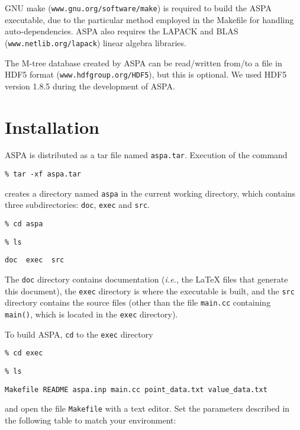 \documentclass[12pt]{article}
\begin{document}
GNU make ({\tt www.gnu.org/software/make}) is required to build the
ASPA executable, due to the particular method employed in the Makefile
for handling auto-dependencies.  ASPA also requires the LAPACK and BLAS
({\tt www.netlib.org/lapack}) linear algebra libraries.

The M-tree database created by ASPA can be read/written from/to a file
in HDF5 format ({\tt www.hdfgroup.org/HDF5}), but this is optional.  We used
HDF5 version 1.8.5 during the development of ASPA.

\section{Installation}

ASPA is distributed as a tar file named {\tt aspa.tar}.  Execution of the command

\vspace{1em}
{\tt \% tar -xf aspa.tar}

\vspace{1em}
\noindent creates a directory named {\tt aspa} in the current working
directory, which contains three subdirectories: {\tt doc}, {\tt exec}
and {\tt src}.

\vspace{1em}
{\tt \% cd aspa}

\vspace{0.5em}
{\tt \% ls}

{\tt doc~ exec~ src}

\vspace{1em}
\noindent The {\tt doc} directory contains documentation ({\em i.e.}, the \LaTeX
files that generate this document), the {\tt exec} directory is where
the executable is built, and the {\tt src} directory contains the
source files (other than the file {\tt main.cc} containing {\tt
main()}, which is located in the {\tt exec} directory).

To build ASPA, {\tt cd} to the {\tt exec} directory

\vspace{1em}
{\tt \% cd exec}

\vspace{0.5em}
{\tt \% ls}

\vspace{0.5em}
{\tt Makefile  README  aspa.inp  main.cc  point\_data.txt  value\_data.txt}
\vspace{1em}

\noindent and open the file {\tt Makefile} with a text editor.  Set
the parameters described in the following table to match your
environment:
\end{document}
